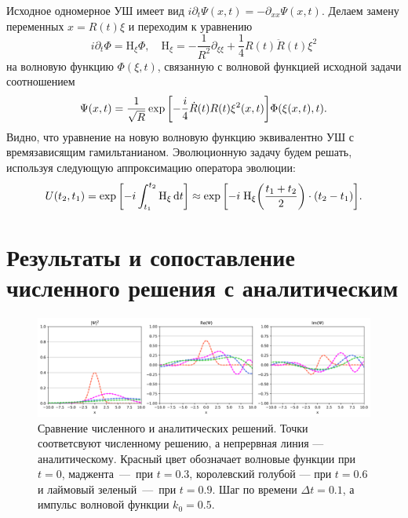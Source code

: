 \documentclass[10pt]{article}
\begin{document}
Исходное одномерное УШ имеет вид $i\partial_t \Psi(x,t) = -\partial_{xx} \Psi(x,t)$. Делаем замену переменных $x = R(t) \xi$ и переходим к уравнению
\begin{equation}
 i\partial_t \Phi = \mathrm{H}_\xi\Phi, \quad \mathrm{H}_\xi = -\dfrac{1}{R^2} \partial_{\xi\xi} + \dfrac{1}{4}R(t)\ddot{R}(t)\xi^2
\end{equation}
на волновую функцию $\Phi(\xi,t)$, связанную с волновой функцией исходной задачи соотношением
\begin{equation}
 \Psi(x,t) = \dfrac{1}{\sqrt{R}} \exp\qty[-\dfrac{i}{4} \dot{R}(t) R(t) \xi^2(x,t) ] \Phi(\xi(x,t),t).
\end{equation}
Видно, что уравнение на новую волновую функцию эквивалентно УШ с времязависящим гамильтанианом. Эволюционную задачу будем решать, используя следующую  аппроксимацию оператора эволюции:
\begin{equation}
 U(t_2,t_1) = \exp\qty[-i\int_{t_1}^{t_2} \mathrm{H}_\xi \dd{t}]\approx\exp\qty[-i\; \mathrm{H}_\xi\qty(\frac{t_1+t_2}{2})\cdot (t_2 - t_1)].
\end{equation}


\section{Результаты и сопоставление численного решения с аналитическим}

\begin{figure}[htbp]
 \centering
 \includegraphics[width=\textwidth]{../figures/comparison.png}
 \caption{Сравнение численного и аналитических решений. Точки соответсвуют численному решению, а непрервная линия --- аналитическому. Красный цвет обозначает волновые функции при $t=0$, маджента~---~при $t=0.3$, королевский голубой --- при $t=0.6$ и лаймовый зеленый~---~при $t=0.9$. Шаг по времени $\Delta t = 0.1$, а импульс волновой функции $k_0 = 0.5$.}
 \label{fig:1}
\end{figure}
\end{document}

